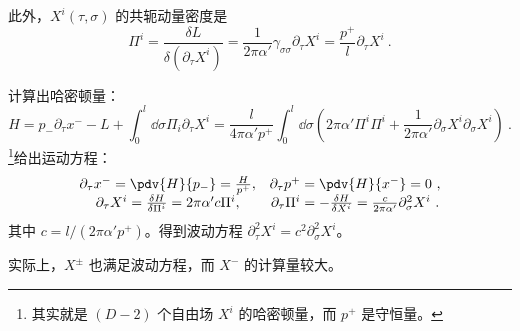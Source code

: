 此外，$X^i(\tau, \sigma)$ 的共轭动量密度是 
\begin{equation}
	\Pi^i = \frac{\delta L}{\delta(\partial_\tau X^i)} = \frac{1}{2\pi \alpha'} \gamma_{\sigma \sigma}\partial_\tau X^i = \frac{p^+}{l} \partial_\tau X^i ~.
\end{equation}

计算出哈密顿量：
\begin{equation}
	H = p_- \partial_\tau x^- - L + \int_0^l \dd \sigma \Pi_i \partial_\tau X^i = \frac{l}{4 \pi \alpha' p^+} \int_0^l \dd \sigma\left(2\pi \alpha' \Pi^i \Pi^i + \frac{1}{2\pi \alpha'} \partial_\sigma X^i \partial_\sigma X^i\right) ~.
\end{equation}
\footnote{其实就是 $(D-2)$ 个自由场 $X^i$ 的哈密顿量，而 $p^+$ 是守恒量。}给出运动方程：
\begin{equation}
	\begin{matrix}
		\partial_\tau x^- = \pdv{H}{p_-} = \frac{H}{p^+}, & \partial_\tau p^+ = \pdv{H}{x^- } = 0 ~,\\
		\partial_\tau X^i = \frac{\delta H}{\delta \Pi^i} = 2\pi\alpha' c \Pi^i, & \partial_\tau \Pi^i = -\frac{\delta H}{\delta X^i} = \frac{c}{2\pi \alpha'} \partial_\sigma^2 X^i ~.
	\end{matrix}
\end{equation}
其中 $c = l/(2\pi\alpha' p^+)$。得到波动方程 $\partial_\tau^2 X^i = c^2 \partial_\sigma^2 X^i$。

实际上，$X^\pm$ 也满足波动方程，而 $X^-$ 的计算量较大。